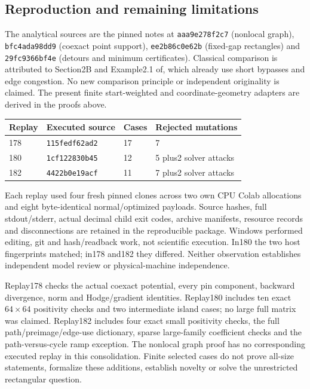 \subsection{Reproduction and remaining limitations}
The analytical sources are the pinned notes at
\texttt{aaa9e278f2c7} (nonlocal graph), \texttt{bfc4ada98dd9} (coexact
point support), \texttt{ee2b86c0e62b} (fixed-gap rectangles) and
\texttt{29fc9366bf4e} (detours and minimum certificates).
Classical comparison is attributed to Section2B and Example2.1
of\cite{geo:comparison}, which already use short bypasses and edge
congestion. No new comparison principle or independent originality is
claimed. The present finite start-weighted and coordinate-geometry
adapters are derived in the proofs above.

\begin{center}\small
\begin{tabular}{llll}
\toprule
Replay & Executed source & Cases & Rejected mutations\\
\midrule
178 & \texttt{115fedf62ad2} & 17 & 7\\
180 & \texttt{1cf122830b45} & 12 & 5 plus2 solver attacks\\
182 & \texttt{4422b0e19acf} & 11 & 7 plus2 solver attacks\\
\bottomrule
\end{tabular}
\end{center}
Each replay used four fresh pinned clones across two own CPU Colab
allocations and eight byte-identical normal/optimized payloads. Source
hashes, full stdout/stderr, actual decimal child exit codes, archive
manifests, resource records and disconnections are retained in the
reproducible package. Windows performed editing, git and hash/readback
work, not scientific execution. In180 the two host fingerprints matched;
in178 and182 they differed. Neither observation establishes independent
model review or physical-machine independence.

Replay178 checks the actual coexact potential, every pin component,
backward divergence, norm and Hodge/gradient identities. Replay180
includes ten exact $64\times64$ positivity checks and two intermediate
island cases; no large full matrix was claimed. Replay182 includes four
exact small positivity checks, the full path/preimage/edge-use dictionary,
sparse large-family coefficient checks and the path-versus-cycle ramp
exception. The nonlocal graph proof has no corresponding executed replay
in this consolidation. Finite selected cases do not prove all-size
statements, formalize these additions, establish novelty or solve the
unrestricted rectangular question.

